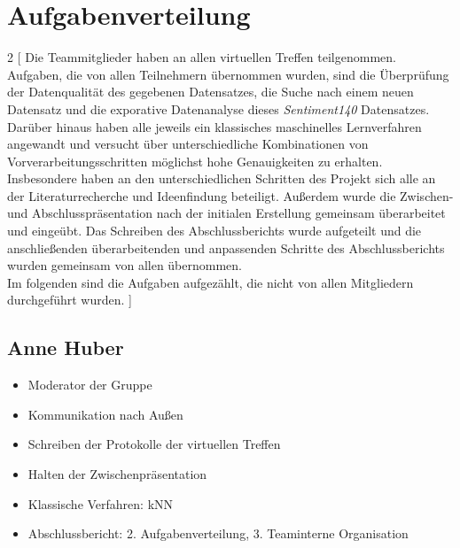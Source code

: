 \section{Aufgabenverteilung}


\begin{multicols}{2}
[
Die Teammitglieder haben an allen virtuellen Treffen teilgenommen. \\
Aufgaben, die von allen Teilnehmern übernommen wurden, sind die Überprüfung der Datenqualität des gegebenen Datensatzes, die Suche nach einem neuen Datensatz und die exporative Datenanalyse dieses \textit{Sentiment140} Datensatzes. Darüber hinaus haben alle jeweils ein klassisches maschinelles Lernverfahren angewandt und versucht über unterschiedliche Kombinationen von Vorverarbeitungsschritten möglichst hohe Genauigkeiten zu erhalten. 
Insbesondere haben an den unterschiedlichen Schritten des Projekt sich alle an der Literaturrecherche und Ideenfindung beteiligt.
Außerdem wurde die Zwischen- und Abschlusspräsentation nach der initialen Erstellung gemeinsam überarbeitet und eingeübt. Das Schreiben des Abschlussberichts wurde aufgeteilt und die anschließenden überarbeitenden und anpassenden Schritte des Abschlussberichts wurden gemeinsam von allen übernommen. \\
Im folgenden sind die Aufgaben aufgezählt, die nicht von allen Mitgliedern durchgeführt wurden.
]

\subsection{Anne Huber}
\begin{itemize}
    \item Moderator der Gruppe
    \item Kommunikation nach Außen
    \item Schreiben der Protokolle der virtuellen Treffen
    \item Halten der Zwischenpräsentation
    \item Klassische Verfahren: kNN
    \item Abschlussbericht: 2. Aufgabenverteilung, 3. Teaminterne Organisation
\end{itemize}



\end{multicols}
